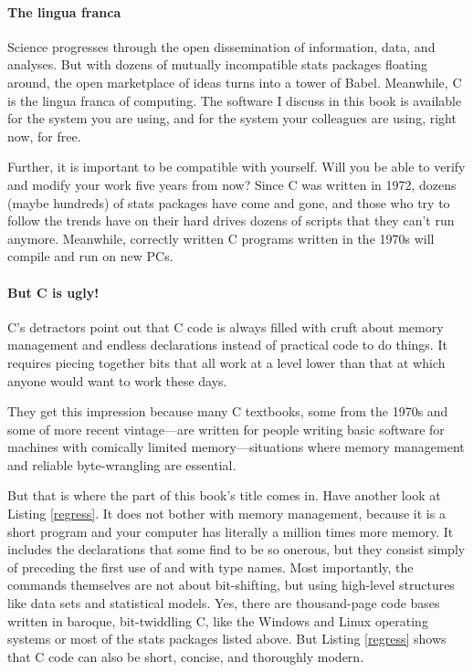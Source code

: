 \paragraph{The lingua franca}
Science progresses through the open dissemination of information, data,
and analyses. But with dozens of mutually incompatible stats packages
floating around, the open marketplace of ideas turns into a tower of Babel.
Meanwhile, C is the lingua franca of computing. The software I discuss
in this book is available for the system you are using, and for the
system your colleagues are using, right now, for free.

Further, it is important to be compatible with yourself. Will you be able
to verify and modify your work five years from now? Since C was written
in 1972, dozens (maybe hundreds) of stats packages have come and gone,
and those who try to follow the trends have on their hard drives dozens
of scripts that they can't run anymore.  Meanwhile, correctly written
C programs written in the 1970s will compile and run on new PCs.

\paragraph{But C is ugly!} C's detractors point out that C code is
always filled with cruft about memory management and endless declarations
instead of practical code to do things. It requires piecing together bits
that all work at a level lower than that at which anyone would want to
work these days.

They get this impression because many C textbooks, some from the 1970s
and some of more recent vintage---are written for people writing basic
software for machines with comically limited memory---situations where
memory management and reliable byte-wrangling are essential.

But that is where the  part of this book's title comes
in. Have another look at Listing \ref{regress}.  It does not bother with
memory management, because it is a short program and your computer has
literally a million times more memory. It includes the declarations
that some find to be so onerous, but they consist simply of preceding
the first use of  and  with type names.
Most importantly, the commands themselves are not
about bit-shifting, but using high-level structures like data sets and
statistical models.  Yes, there are thousand-page code bases written in
baroque, bit-twiddling C, like the Windows and Linux operating systems
or most of the stats packages listed above. But Listing \ref{regress}
shows that C code can also be short, concise, and thoroughly modern.


